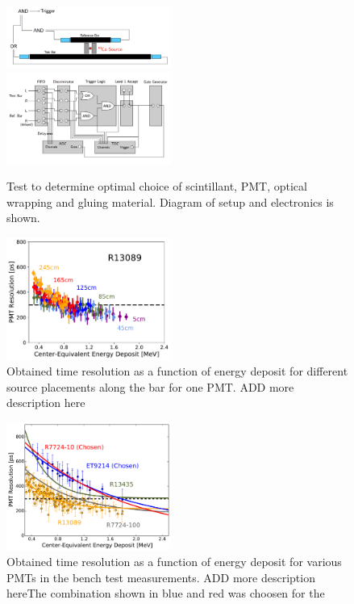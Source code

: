 \documentclass[3p,final,twocolumn]{elsarticle}
\begin{document}
\begin{figure}[th!]
	\centering
		\includegraphics[width=0.48\textwidth]{phys_setup.png} \\
		\includegraphics[width=0.48\textwidth]{electr_setup.png}
	\caption{Test to determine optimal choice of scintillant, PMT, optical wrapping and gluing material. Diagram of setup and electronics is shown. }
	\label{fig:test_stand_setup}
\end{figure}

\begin{figure}[h!]
	\centering
		\includegraphics[width=0.48\textwidth]{pos-dep.pdf}
		\caption{Obtained time resolution as a function of energy deposit for different source placements along the bar for one PMT.{\color{red} ADD more description here} }
	\label{fig:test_stand_posdep}
\end{figure}


\begin{figure}[h!]
	\centering
		\includegraphics[width=0.48\textwidth]{all-lines-somedata.pdf}
		\caption{Obtained time resolution as a function of energy deposit for various PMTs in the bench test measurements. {\color{red} ADD more description here}The combination shown in blue and red was choosen for the }
	\label{fig:test_stand_results}
\end{figure}
\end{document}

